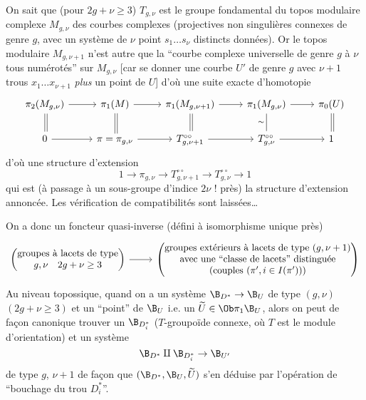 On sait que (pour $2g + \nu \geq 3$) $T_{g, \nu}$ est le groupe fondamental du topos modulaire complexe $M_{g, \nu}$ des courbes complexes (projectives non singulières connexes de genre $g$, avec un système de $\nu$ point $s_1 \dots s_{\nu}$ distincts données). Or le topos modulaire $M_{g, \nu + 1}$ n'est autre que la ``courbe complexe universelle de genre $g$ à $\nu$ tous numérotés'' sur $M_{g, \nu}$ [car se donner une courbe $U'$ de genre $g$ avec $\nu + 1$ trous $x_1 \dots x_{\nu + 1}$ \emph{plus} un point de $U$] d'où une suite exacte d'homotopie  
\[\begin{tikzcd}
	{\pi_2(M_{g, \nu})} & {\pi_1(M)} & {\pi_1(M_{g, \nu + 1})} & {\pi_1(M_{g, \nu})} & {\pi_0(U)} \\
	0 & {\pi = \pi_{g, \nu}} & {T^{\circ\circ}_{g, \nu + 1}} & {T^{\circ\circ}_{g, \nu}} & 1
	\arrow[from=1-1, to=1-2]
	\arrow[from=1-2, to=1-3]
	\arrow[from=2-1, to=2-2]
	\arrow[from=2-2, to=2-3]
	\arrow[shift left=1, no head, from=1-1, to=2-1]
	\arrow[no head, from=1-1, to=2-1]
	\arrow[shift left=1, no head, from=1-2, to=2-2]
	\arrow[no head, from=1-2, to=2-2]
	\arrow[shift left=1, no head, from=1-3, to=2-3]
	\arrow[no head, from=1-3, to=2-3]
	\arrow[from=1-3, to=1-4]
	\arrow[from=2-3, to=2-4]
	\arrow[from=1-4, to=1-5]
	\arrow[from=2-4, to=2-5]
	\arrow["\sim"', no head, from=1-4, to=2-4]
	\arrow[shift left=1, no head, from=1-5, to=2-5]
	\arrow[no head, from=1-5, to=2-5]
\end{tikzcd}\]
d'où une structure d'extension
$$
1 \to \pi_{g, \nu} \to T^{\circ\circ}_{g, \nu + 1} \to T^{\circ\circ}_{g, \nu} \to 1
$$
qui est (à passage à un sous-groupe d'indice $2 \nu$ ! près) la structure d'extension annoncée. Les vérification de compatibilités sont laissées\dots 

On a donc un foncteur quasi-inverse (défini à isomorphisme unique près)
\[\begin{tikzcd}
	{\begin{pmatrix} \text{groupes à lacets de type} \\ g, \nu \quad 2g + \nu \geq 3 \end{pmatrix}} & {\begin{pmatrix} \text{groupes extérieurs à lacets de type}~(g, \nu + 1) \\ \text{avec une ``classe de lacets'' distinguée} \\ \text{(couples}~(\pi', i \in I(\pi'))) \end{pmatrix}}
	\arrow[from=1-1, to=1-2]
\end{tikzcd}\]
Au niveau topossique, quand on a un système $\B_{D^*} \to \B_U$ de type $(g, \nu)$ $(2g + \nu \geq 3)$ et un ``point'' de $\B_U$ i.e. un $\widetilde{U} \in \Ob \pi_1 \B_U$, alors on peut de fa\c{c}on canonique trouver un $\B_{D^*_i}$ ($T$-groupoïde connexe, où $T$ est le module d'orientation) et un système
$$
\B_{D^*} \amalg \B_{D^*_i} \to \B_{U'}
$$
de type $g$, $\nu + 1$ de fa\c{c}on que $(\B_{D^*}, \B_U, \widetilde{U})$ s'en déduise  par l'opération de ``bouchage du trou $D^*_i$''.

